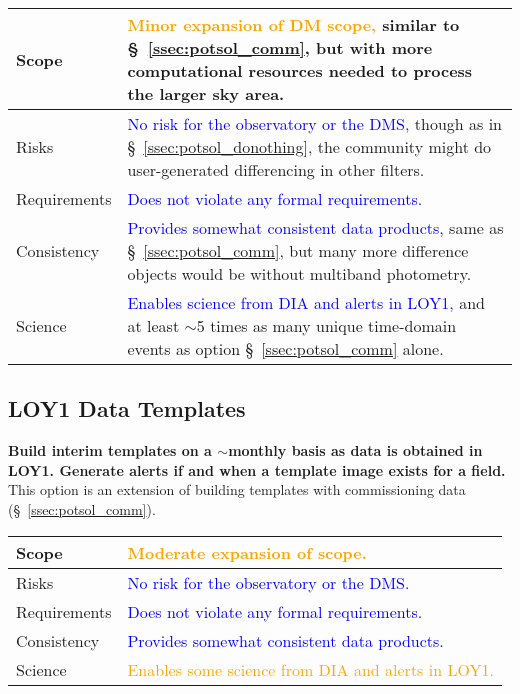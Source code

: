 \documentclass[DM,lsstdraft,toc]{lsstdoc}
\begin{document}
\begin{center}
\begin{tabular}{|p{2.5cm}|p{13cm}|}
\hline
Scope & \textcolor{orange}{Minor expansion of DM scope,} similar to \S~\ref{ssec:potsol_comm}, but with more computational resources needed to process the larger sky area.  \\
\hline
Risks & \textcolor{blue}{No risk for the observatory or the DMS,} though as in \S~\ref{ssec:potsol_donothing}, the community might do user-generated differencing in other filters. \\
\hline
Requirements & \textcolor{blue}{Does not violate any formal requirements.} \\
\hline
Consistency & \textcolor{blue}{Provides somewhat consistent data products,} same as \S~\ref{ssec:potsol_comm}, but many more difference objects would be without multiband photometry.  \\
\hline
Science & \textcolor{blue}{Enables science from DIA and alerts in LOY1,} and at least $\sim$5 times as many unique time-domain events as option \S~\ref{ssec:potsol_comm} alone. \\
\hline
\end{tabular}
\end{center}

\clearpage
\subsection{LOY1 Data Templates}\label{ssec:potsol_cont}

{\bf Build interim templates on a $\sim$monthly basis as data is obtained in LOY1. Generate alerts if and when a template image exists for a field.} This option is an extension of building templates with commissioning data (\S~\ref{ssec:potsol_comm}).

\begin{center}
\begin{tabular}{|p{2.5cm}|p{13cm}|}
\hline
Scope & \textcolor{orange}{Moderate expansion of scope.} \\
\hline
Risks & \textcolor{blue}{No risk for the observatory or the DMS.} \\
\hline
Requirements & \textcolor{blue}{Does not violate any formal requirements.} \\
\hline
Consistency & \textcolor{blue}{Provides somewhat consistent data products.} \\
\hline
Science & \textcolor{orange}{Enables some science from DIA and alerts in LOY1.} \\
\hline
\end{tabular}
\end{center}
\end{document}

